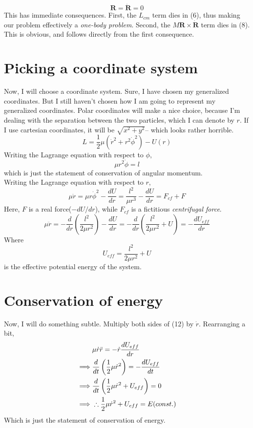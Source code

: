 \documentclass[12pt, letterpaper]{article}
\begin{document}
\[
\mathbf{R}=\mathbf{\dot{R}}=0
\]
This has immediate consequences. First, the $L_{cm}$ term dies in (6), thus making our problem effectively a \textit{one-body problem}. Second, the $M\mathbf{R}\times\dot{\mathbf{R}}$ term dies in (8). This is obvious, and follows directly from the first consequence. 
\\
\section{Picking a coordinate system}
Now, I will choose a coordinate system. Sure, I have chosen my generalized coordinates. But I still haven't chosen how I am going to represent my generalized coordinates. Polar coordinates will make a nice choice, because I'm dealing with the separation between the two particles, which I can denote by $r$. If I use cartesian coordinates, it will be $\sqrt{x^2+y^2}$-- which looks rather horrible. 
\begin{equation}
    L = \frac{1}{2}\mu(\dot{r}^2+r^2\dot{\phi}^2)-U(r)
\end{equation}
Writing the Lagrange equation with respect to $\phi$,
\begin{equation}
    \mu r^2 \dot{\phi}=l
\end{equation}
which is just the statement of conservation of angular momentum. \\
Writing the Lagrange equation with respect to $r$,
\begin{equation}
    \mu \ddot{r}=\mu r \dot{\phi}^2-\frac{dU}{dr}=\frac{l^2}{\mu r^3}-\frac{dU}{dr} = F_{cf}+F
\end{equation}
Here, $F$ is a real force($-dU/dr$), while $F_{cf}$ is a fictitious \textit{centrifugal force}. 
\begin{equation}
    \mu \ddot{r}=-\frac{d}{dr}\left(\frac{l^2}{2\mu r^2}\right)-\frac{dU}{dr} = -\frac{d}{dr}\left(\frac{l^2}{2\mu r^2}+U\right)=-\frac{dU_{eff}}{dr}
\end{equation}
Where 
\[U_{eff}=\frac{l^2}{2\mu r^2}+U\]
is the effective potential energy of the system. \\ 
\section{Conservation of energy} 
Now, I will do something subtle. Multiply both sides of (12) by $\dot{r}$. Rearranging a bit,
\begin{align}
              &\mu \dot{r}\ddot{r} =-\dot{r}\frac{dU_{eff}}{dr} \notag \\
    \implies &\frac{d}{dt}\left(\frac{1}{2}\mu\dot{r}^2\right)=-\frac{dU_{eff}}{dt} \notag\\
    \implies &\frac{d}{dt}\left(\frac{1}{2}\mu\dot{r}^2+U_{eff} \right)=0\notag\\
    \implies &\therefore \frac{1}{2}\mu\dot{r}^2+U_{eff}=E(const.)
\end{align}
Which is just the statement of conservation of energy.\\
\end{document}
